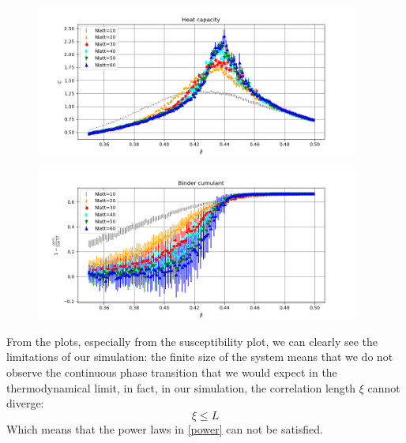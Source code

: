 \documentclass[11pt]{scrartcl} %
\begin{document}
\begin{figure}
	\centering
	\includegraphics[width=0.95\textwidth]{figures/heat_capacity.png}
\end{figure}
\begin{figure}
	\centering
	\includegraphics[width=0.95\textwidth]{figures/binder.png}
\end{figure}
From the plots, especially from the susceptibility plot, we can clearly see the limitations of our simulation: the finite size of the system means that we do not observe the continuous phase transition that we would expect in the thermodynamical limit, in fact, in our simulation, the correlation length $\xi$ cannot diverge:
\begin{equation}
\label{limitation}
\xi \leq L
\end{equation}
Which means that the power laws in \eqref{power} can not be satisfied.
\end{document}
